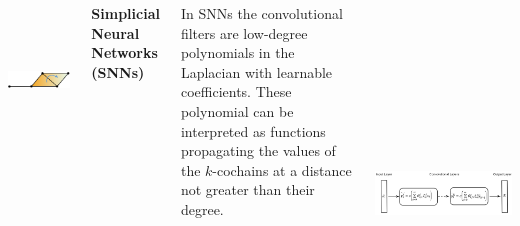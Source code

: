 \documentclass[landscape,a0paper,blockverticalspace = 7mm]{tikzposter}
\begin{document}
\begin{columns}
{{\begin{center}
\begin{minipage}{0.2\linewidth}
\begin{center}
          \vspace{1cm}
        
          \end{center}
      \end{minipage} \hspace{3.5cm}
	\begin{minipage}{0.2\linewidth}
	\begin{center}
          \includegraphics[height=4cm]{figures/glap2.png}
          
        
          \end{center}
      \end{minipage} 
      \end{center}



 \begin{center} 
\Large{\textbf{Simplicial Neural Networks (SNNs)}}
\end{center}
\vspace{0.3cm}
In SNNs the convolutional filters are low-degree polynomials in the Laplacian with learnable coefficients.
These polynomial can be interpreted as functions propagating the values of the $k$-cochains at a distance not greater than their degree.


\vspace{0.3cm}

      \begin{center}
          \includegraphics[height=10cm]{figures/net.png}
          \end{center}

}}
\end{columns}
\end{document}
